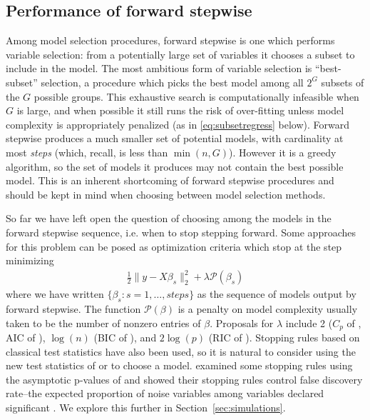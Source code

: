 \documentclass{imsart}
\newcommand{\pen}{\mathcal{P}}
\begin{document}
\subsection{Performance of forward stepwise}
\label{sec:fs:performance}

Among model selection procedures, forward stepwise is one which performs
variable selection: from a potentially large set of variables it chooses
a subset to include in the model. The most ambitious form of variable
selection is  ``best-subset'' selection, a procedure which picks the
best model among all $2^G$ subsets of the $G$ possible groups.
This exhaustive search is computationally infeasible when $G$ is
large, and when possible it still
runs the risk of over-fitting unless model complexity is
appropriately penalized (as in \eqref{eq:subsetregress} below).
Forward stepwise produces a much
smaller set of potential models, with cardinality at most
\textit{steps} (which, recall, is less than $\min(n,G)$). However
it is a greedy algorithm, so the set of models it produces may not
contain the best possible model. This is an inherent shortcoming of
forward stepwise procedures and should be kept in mind when choosing
between model selection methods.

So far we have left open the question of choosing among the models in
the forward stepwise sequence, i.e. when to stop stepping
forward. Some approaches for this problem can be posed as optimization
criteria which stop at the step minimizing
\begin{equation}
\begin{aligned}
\label{eq:subsetregress}
\frac{1}{2} \| y - X \beta_s \|_2^2 + \lambda \pen(\beta_s)
\end{aligned}
\end{equation}
where we have written $\{ \beta_s : s = 1, \ldots, steps \}$ as
the sequence of models output by forward stepwise. The function
$\pen(\beta)$ is a penalty on model complexity usually taken to be the
number of nonzero entries of $\beta$. Proposals for $\lambda$ include
2 ($C_p$ of \cite{CP}, AIC of \cite{AIC}), $\log(n)$ (BIC of \cite{BIC}), and
$2\log(p)$ (RIC of \cite{RIC}). Stopping rules based on classical test
statistics have also been used, so it is natural to consider using
the new test statistics of \cite{significance:lasso} or
\cite{tests:adaptive}
to choose a model. \cite{sequential:fdr} examined some stopping rules
using the asymptotic p-values of \cite{significance:lasso} and showed
their stopping rules control false discovery rate--the expected
proportion of noise variables among variables declared significant
\citep{fdr}. We explore this further in Section~\ref{sec:simulations}.
\end{document}
